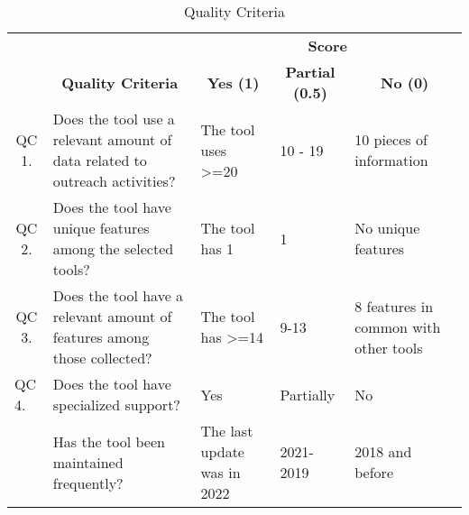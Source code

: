 \begin{table}
  \centering
  \caption{Quality Criteria}
  \label{tbl:gl-quality-criteria}
  \footnotesize
  \begin{tabular}{c|p{4.2cm}|p{3cm}|p{2.5cm}|p{3cm}}
    \bottomrule
    \rowcolor[rgb]{0.753,0.753,0.753} {\cellcolor[rgb]{0.753,0.753,0.753}}                              & \multicolumn{1}{c|}{{\cellcolor[rgb]{0.753,0.753,0.753}}}                                            & \multicolumn{3}{c}{\textbf{\textbf{Score}}}                                                                                       \\
    \hhline{>{\arrayrulecolor[rgb]{0.753,0.753,0.753}}-->{\arrayrulecolor{black}}---}
    \rowcolor[rgb]{0.753,0.753,0.753} \multirow{-2}{*}{{\cellcolor[rgb]{0.753,0.753,0.753}}\textbf{ID}} & \multicolumn{1}{c|}{\multirow{-2}{*}{{\cellcolor[rgb]{0.753,0.753,0.753}}\textbf{Quality Criteria}}} & \multicolumn{1}{c|}{\textbf{Yes (1)}}       & \multicolumn{1}{c|}{\textbf{Partial (0.5)}} & \multicolumn{1}{c}{\textbf{No (0)}}   \\
    \hline
    \rowcolor[rgb]{0.898,0.898,0.898} QC 1.                                                             & Does the tool use a relevant amount of data related to outreach activities?                          & The tool uses >=20                          & 10 - 19                                     & 10 pieces of information              \\
    QC 2.                                                                                               & Does the tool have unique features among the selected tools?                                         & The tool has 1                              & 1                                           & No unique features                    \\
    \rowcolor[rgb]{0.898,0.898,0.898} QC 3.                                                             & Does the tool have a relevant amount of features among those collected?                              & The tool has >=14                           & 9-13                                        & 8 features in common with other tools \\
    \multicolumn{1}{l|}{QC 4.}                                                                          & Does the tool have specialized support?                                                              & Yes                                         & Partially                                   & No                                    \\
    \rowcolor[rgb]{0.898,0.898,0.898} \multicolumn{1}{l|}{QC 5.}                                        & Has the tool been maintained frequently?                                                             & The last update was in 2022                 & 2021-2019                                   & 2018 and before                       \\
    \toprule
  \end{tabular}
\end{table}